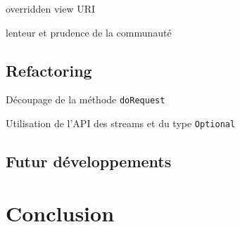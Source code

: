 \documentclass[a4paper, 11pt]{report}
\begin{document}
overridden view URI

lenteur et prudence de la communauté

\section{Refactoring}

Découpage de la méthode \verb=doRequest=

Utilisation de l'API des streams et du type \verb=Optional=

\section{Futur développements}

\chapter{Conclusion}

\clearpage



\end{document}
